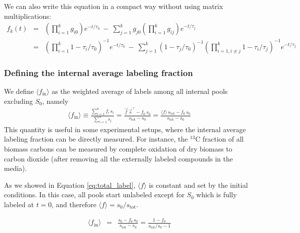 \documentclass{article}
\newcommand{\favg}{\ensuremath{\langle f \rangle}}
\newcommand{\fin}{\ensuremath{\langle f_{\text{in}} \rangle}}
\newcommand{\stot}{\ensuremath{s_\text{tot}}}
\begin{document}
We can also write this equation in a compact way without using matrix multiplications:
\begin{eqnarray}
    f_k(t) &=& \left(\prod_{i=1}^{k} g_{i0}\right) e^{- t/\tau_0}
    ~-~ \sum_{j=1}^{k} g_{j0} \left(\prod_{i=1}^{k} g_{ij}\right) e^{- t/\tau_j} \\
    &=& 
    \left(\prod_{i=1}^{k} 1 - \tau_i/\tau_0 \right)^{-1} e^{- t/\tau_0}
    ~-~
    \sum_{j=1}^{k} (1-\tau_j/\tau_0)^{-1} \left(\prod_{i = 1, i \neq j}^{k} 1 - \tau_i/\tau_j\right)^{-1} e^{- t/\tau_j}
\end{eqnarray}

\subsubsection{Defining the internal average labeling fraction}

We define $\fin$ as the weighted average of labels among all internal pools excluding $S_0$, namely 
\begin{eqnarray}
	\fin \equiv 
	\frac{\sum_{i=1}^{n} f_i \, s_i}{\sum_{i=1}^{n} s_i} =
	\frac{\vec{f} \, \vec{s}^\top - f_0 \, s_0}{\stot - s_0} = 
	\frac{\favg \, \stot - f_0 \, s_0}{\stot - s_0}
\end{eqnarray}
This quantity is useful in some experimental setups, where the internal average labeling fraction can be directly measured. For instance, the $^{13}$C fraction of all biomass carbons can be measured by complete oxidation of dry biomass to carbon dioxide (after removing all the externally labeled compounds in the media).

As we showed in Equation \ref{eq:total_label}, $\favg$ is constant and set by the initial conditions. In this case, all pools start unlabeled except for $S_0$ which is fully labeled at $t = 0$, and therefore $\favg = s_0 / \stot$.

\begin{eqnarray}
	\fin &=& 
	\frac{s_0 - f_0 \, s_0}{\stot - s_0} = 
	\frac{1 - f_0}{\stot/s_0 - 1}
\end{eqnarray}
\end{document}
